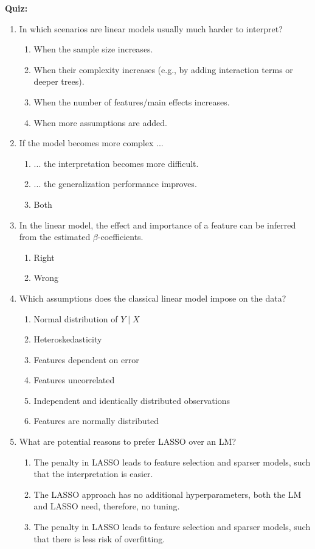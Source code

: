 \textbf{Quiz:}
\begin{enumerate}

\item In which scenarios are linear models usually much harder to interpret?
\begin{enumerate}
	\item When the sample size increases.
	\item When their complexity increases (e.g., by adding interaction terms or deeper trees).
	\item When the number of features/main effects increases.
	\item When more assumptions are added.
\end{enumerate}

\item If the model becomes more complex ... 
\begin{enumerate}
	\item ... the interpretation becomes more difficult.
	\item ... the generalization performance improves.
	\item Both
\end{enumerate}

\item In the linear model, the effect and importance of a feature can be inferred from the estimated $\beta$-coefficients. 
\begin{enumerate}
	\item Right
	\item Wrong
\end{enumerate}

\item Which assumptions does the classical linear model impose on the data?
\begin{enumerate}
	\item Normal distribution of $Y \mid X$
	\item Heteroskedasticity
	\item Features dependent on error 
	\item Features uncorrelated
	\item Independent and identically distributed observations
	\item Features are normally distributed
\end{enumerate}

\item What are potential reasons to prefer LASSO over an LM?
\begin{enumerate}
	\item The penalty in LASSO leads to feature selection and sparser models, such that the interpretation is easier. 
	\item The LASSO approach has no additional hyperparameters, both the LM and LASSO need, therefore, no tuning. 
	\item The penalty in LASSO leads to feature selection and sparser models, such that there is less risk of overfitting.
\end{enumerate}


\end{enumerate}
